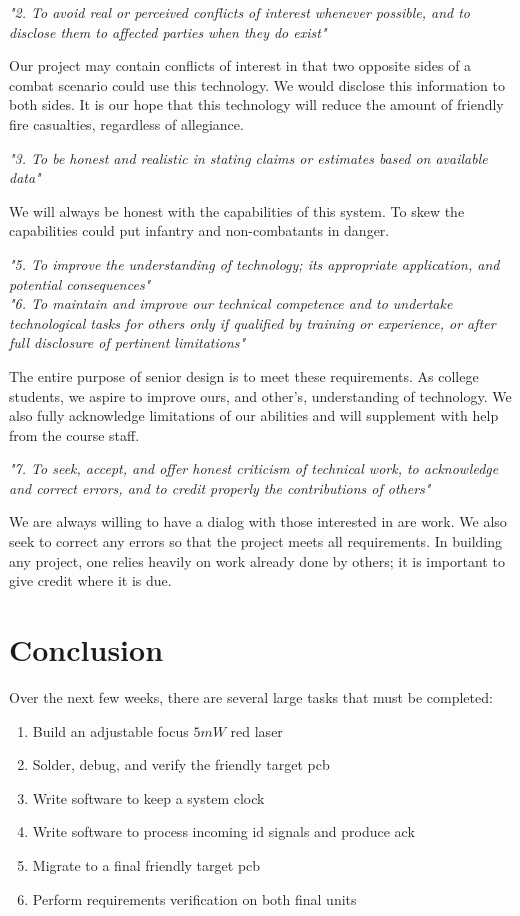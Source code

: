 \documentclass[letterpaper,10pt]{article}
\begin{document}
\begin{spacing}{1.15}
\textit{"2. To avoid real or perceived conflicts of interest whenever possible, and to disclose them to affected parties when they do exist"}

Our project may contain conflicts of interest in that two opposite sides of a combat scenario could use this technology. We would disclose this information to both sides. It is our hope that this technology will reduce the amount of friendly fire casualties, regardless of allegiance. 

\textit{"3. To be honest and realistic in stating claims or estimates based on available data"}

We will always be honest with the capabilities of this system. To skew the capabilities could put infantry and non-combatants in danger. 

\textit{"5. To improve the understanding of technology; its appropriate application, and potential consequences"}\\
\textit{"6. To maintain and improve our technical competence and to undertake technological tasks for others only if qualified by training or experience, or after full disclosure of pertinent limitations"}

The entire purpose of senior design is to meet these requirements. As college students, we aspire to improve ours, and other's, understanding of technology. We also fully acknowledge limitations of our abilities and will supplement with help from the course staff. 

\textit{"7. To seek, accept, and offer honest criticism of technical work, to acknowledge and correct errors, and to credit properly the contributions of others"}

We are always willing to have a dialog with those interested in are work. We also seek to correct any errors so that the project meets all requirements. In building any project, one relies heavily on work already done by others; it is important to give credit where it is due. 

\section{Conclusion}
Over the next few weeks, there are several large tasks that must be completed: 
\begin{enumerate}
	\item Build an adjustable focus $5mW$ red laser
	\item Solder, debug, and verify the friendly target pcb
	\item Write software to keep a system clock
	\item Write software to process incoming id signals and produce ack
	\item Migrate to a final friendly target pcb
	\item Perform requirements verification on both final units
\end{enumerate}


\end{spacing}
\end{document}
